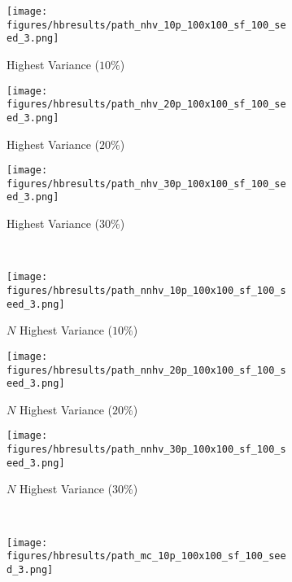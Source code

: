 \begin{figure}[htb!]
    \centering
        \begin{subfigure}[t]{0.32\textwidth}
        \centering
        \texttt{[image: figures/hbresults/path\_nhv\_10p\_100x100\_sf\_100\_seed\_3.png]}
        \ssp
        \captionsetup{skip=0.20\baselineskip,size=footnotesize}
        \caption{Highest Variance ($10\%$)}
    \end{subfigure}%
    \begin{subfigure}[t]{0.32\textwidth}
        \centering
        \texttt{[image: figures/hbresults/path\_nhv\_20p\_100x100\_sf\_100\_seed\_3.png]}
        \ssp
        \captionsetup{skip=0.20\baselineskip,size=footnotesize}
        \caption{Highest Variance ($20\%$)}
    \end{subfigure}%
    \begin{subfigure}[t]{0.32\textwidth}
        \centering
        \texttt{[image: figures/hbresults/path\_nhv\_30p\_100x100\_sf\_100\_seed\_3.png]}
        \ssp
        \captionsetup{skip=0.20\baselineskip,size=footnotesize}
        \caption{Highest Variance ($30\%$)}
    \end{subfigure}%
    \\
    \begin{subfigure}[t]{0.32\textwidth}
        \centering
        \texttt{[image: figures/hbresults/path\_nnhv\_10p\_100x100\_sf\_100\_seed\_3.png]}
        \ssp
        \captionsetup{skip=0.20\baselineskip,size=footnotesize}
        \caption{$N$ Highest Variance ($10\%$)}
    \end{subfigure}%
    \begin{subfigure}[t]{0.32\textwidth}
        \centering
        \texttt{[image: figures/hbresults/path\_nnhv\_20p\_100x100\_sf\_100\_seed\_3.png]}
        \ssp
        \captionsetup{skip=0.20\baselineskip,size=footnotesize}
        \caption{$N$ Highest Variance ($20\%$)}
    \end{subfigure}%
    \begin{subfigure}[t]{0.32\textwidth}
        \centering
        \texttt{[image: figures/hbresults/path\_nnhv\_30p\_100x100\_sf\_100\_seed\_3.png]}
        \ssp
        \captionsetup{skip=0.20\baselineskip,size=footnotesize}
        \caption{$N$ Highest Variance ($30\%$)}
    \end{subfigure}%
    \\
    \begin{subfigure}[t]{0.32\textwidth}
        \centering
        \texttt{[image: figures/hbresults/path\_mc\_10p\_100x100\_sf\_100\_seed\_3.png]}

\end{subfigure}
\end{figure}

